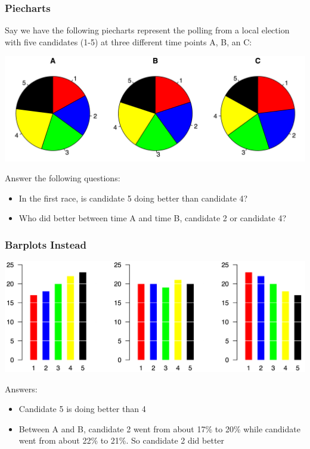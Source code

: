 \documentclass[handout]{beamer}
\begin{document}
\begin{frame}[fragile]
\frametitle{Piecharts}
Say we have the following piecharts represent the polling from a local election with five candidates (1-5) at three different time points A, B, an C:

\begin{center}
\includegraphics[width=\textwidth]{figure/piecharts.png}
\end{center}

\pause Answer the following questions:
\begin{itemize}
\item In the first race, is candidate 5 doing better than candidate 4?
\item Who did better between time A and time B, candidate 2 or candidate 4?
\end{itemize}

\end{frame}


\begin{frame}[fragile]
\frametitle{Barplots Instead}

\begin{center}
\includegraphics[width=\textwidth]{figure/barplots.png}
\end{center}

\vspace{0.5cm}

\pause Answers:
\begin{itemize}
\item Candidate 5 is doing better than 4
\item Between A and B, candidate 2 went from about 17\% to 20\% while candidate went from about 22\% to 21\%.  So candidate 2 did better
\end{itemize}

\end{frame}
\end{document}
